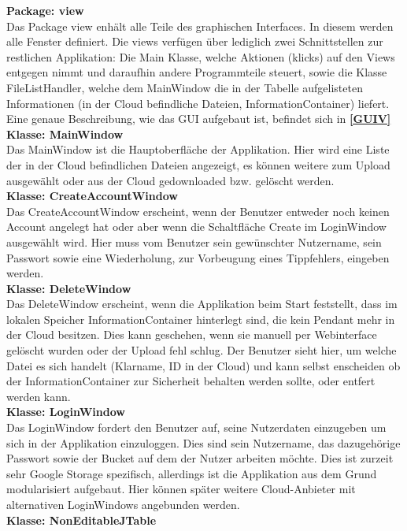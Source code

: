 \documentclass[12pt,a4paper,bibliography=totocnumbered,listof=totocnumbered]{scrartcl}
\newcommand*{\fullref}[1]{\textbf{\hyperref[{#1}]{\ref*{#1} \nameref*{#1}}}}
\begin{document}
\textbf{Package: view}\\
Das Package view enhält alle Teile des graphischen Interfaces. In diesem werden alle Fenster definiert. Die views verfügen über lediglich zwei Schnittstellen zur restlichen Applikation: Die Main Klasse, welche Aktionen (klicks) auf den Views entgegen nimmt und daraufhin andere Programmteile steuert, sowie die Klasse FileListHandler, welche dem MainWindow die in der Tabelle aufgelisteten Informationen (in der Cloud befindliche Dateien, InformationContainer) liefert. Eine genaue Beschreibung, wie das GUI aufgebaut ist, befindet sich in \fullref{GUIV}\\
\textbf{Klasse: MainWindow}\\
Das MainWindow ist die Hauptoberfläche der Applikation. Hier wird eine Liste der in der Cloud befindlichen Dateien angezeigt, es können weitere zum Upload ausgewählt oder aus der Cloud gedownloaded bzw. gelöscht werden.\\
\textbf{Klasse: CreateAccountWindow}\\
Das CreateAccountWindow erscheint, wenn der Benutzer entweder noch keinen Account angelegt hat oder aber wenn die Schaltfläche Create im LoginWindow ausgewählt wird. Hier muss vom Benutzer sein gewünschter Nutzername, sein Passwort sowie eine Wiederholung, zur Vorbeugung eines Tippfehlers, eingeben werden.\\
\textbf{Klasse: DeleteWindow}\\
Das DeleteWindow erscheint, wenn die Applikation beim Start feststellt, dass im lokalen Speicher InformationContainer hinterlegt sind, die kein Pendant mehr in der Cloud besitzen. Dies kann geschehen, wenn sie manuell per Webinterface gelöscht wurden oder der Upload fehl schlug. Der Benutzer sieht hier, um welche Datei es sich handelt (Klarname, ID in der Cloud) und kann selbst enscheiden ob der InformationContainer zur Sicherheit behalten werden sollte, oder entfert werden kann.\\
\textbf{Klasse: LoginWindow}\\
Das LoginWindow fordert den Benutzer auf, seine Nutzerdaten einzugeben um sich in der Applikation einzuloggen. Dies sind sein Nutzername, das dazugehörige Passwort sowie der Bucket auf dem der Nutzer arbeiten möchte. Dies ist zurzeit sehr Google Storage spezifisch, allerdings ist die Applikation aus dem Grund modularisiert aufgebaut. Hier können später weitere Cloud-Anbieter mit alternativen LoginWindows angebunden werden.\\
\textbf{Klasse: NonEditableJTable}\\
\end{document}
